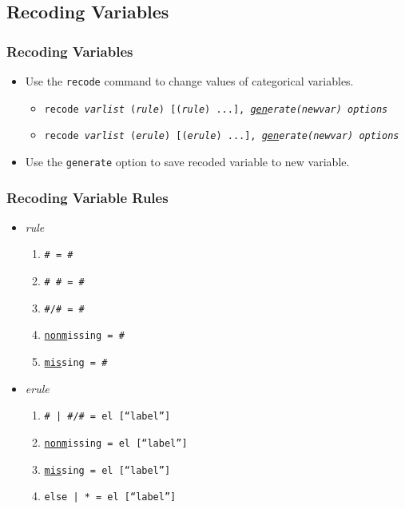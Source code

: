 \documentclass{beamer}
\begin{document}
\subsection{Recoding Variables}

\begin{frame}
	\frametitle{Recoding Variables}
		\begin{itemize}
			\item Use the \texttt{recode} command to change values of categorical variables.
				\begin{itemize}
					\item \texttt{recode \textit{varlist} (\textit{rule}) [(\textit{rule}) ...], \textit{\underline{gen}erate(\textit{newvar}) options}}
					\item \texttt{recode \textit{varlist} (\textit{erule}) [(\textit{erule}) ...], \textit{\underline{gen}erate(\textit{newvar}) options}}
				\end{itemize}
			\item Use the \texttt{generate} option to save recoded variable to new variable.
		\end{itemize}
\end{frame}

\begin{frame}
	\frametitle{Recoding Variable Rules}
		\begin{itemize}
			\item \textit{rule}
				\begin{enumerate}
					\item \texttt{\# = \#}
					\item \texttt{\# \# = \#}
					\item \texttt{\#/\# = \#}
					\item \texttt{\underline{nonm}issing = \#}
					\item \texttt{\underline{mis}sing = \#}
				\end{enumerate}
			\item \textit{erule}
				\begin{enumerate}
					\item \texttt{\# | \#/\# = el [``label'']}
					\item \texttt{\underline{nonm}issing = el [``label'']}
					\item \texttt{\underline{mis}sing = el [``label'']}
					\item \texttt{else | * = el [``label'']}
				\end{enumerate}
		\end{itemize}
\end{frame}
\end{document}
